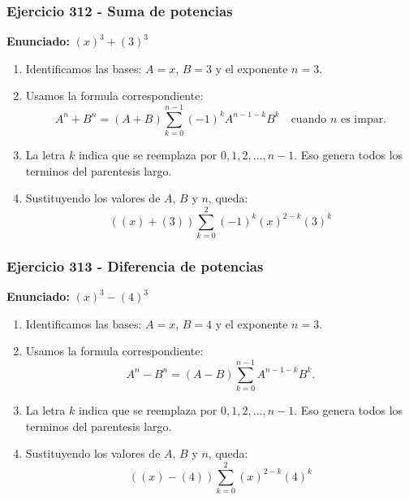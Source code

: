 \documentclass[11pt,a4paper]{article}
\begin{document}
\subsubsection*{Ejercicio 312 - Suma de potencias}
\textbf{Enunciado:} $ \left(x\right)^{3}+\left(3\right)^{3} $\par
\begin{enumerate}[leftmargin=2em]
\item Identificamos las bases: \(A=x\), \(B=3\) y el exponente \(n=3\).
\item Usamos la formula correspondiente: \[A^n+B^n=(A+B)\sum_{k=0}^{n-1}(-1)^kA^{n-1-k}B^k\quad\text{cuando }n\text{ es impar}.\]
\item La letra \(k\) indica que se reemplaza por \(0,1,2,\ldots,n-1\). Eso genera todos los terminos del parentesis largo.
\item Sustituyendo los valores de \(A\), \(B\) y \(n\), queda: \[\boxed{\left(\left(x\right)+\left(3\right)\right)\sum_{k=0}^{2}(-1)^k\left(x\right)^{2-k}\left(3\right)^k}\]
\end{enumerate}

\vspace{0.2cm}
\subsubsection*{Ejercicio 313 - Diferencia de potencias}
\textbf{Enunciado:} $ \left(x\right)^{3}-\left(4\right)^{3} $\par
\begin{enumerate}[leftmargin=2em]
\item Identificamos las bases: \(A=x\), \(B=4\) y el exponente \(n=3\).
\item Usamos la formula correspondiente: \[A^n-B^n=(A-B)\sum_{k=0}^{n-1}A^{n-1-k}B^k.\]
\item La letra \(k\) indica que se reemplaza por \(0,1,2,\ldots,n-1\). Eso genera todos los terminos del parentesis largo.
\item Sustituyendo los valores de \(A\), \(B\) y \(n\), queda: \[\boxed{\left(\left(x\right)-\left(4\right)\right)\sum_{k=0}^{2}\left(x\right)^{2-k}\left(4\right)^k}\]
\end{enumerate}

\vspace{0.2cm}
\end{document}
